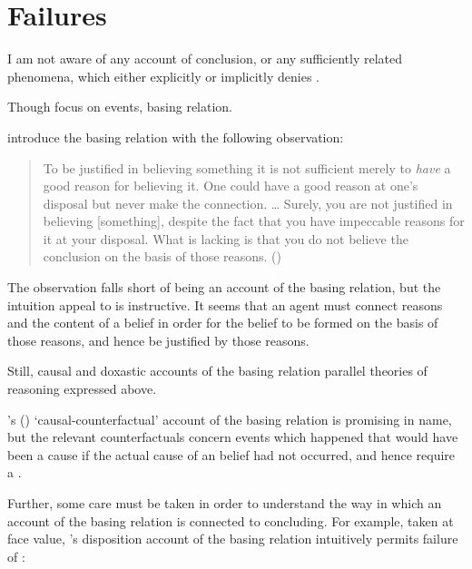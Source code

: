 \section{Failures}
\label{sec:failures}

\begin{note}
  I am not aware of any account of conclusion, or any sufficiently related phenomena, which either explicitly or implicitly denies \issueConstraint{}.
\end{note}

\begin{note}
  Though focus on events, basing relation.

  \citeauthor{Pollock:1999tm} introduce the basing relation with the following observation:
  \begin{quote}
    To be justified in believing something it is not sufficient merely to \emph{have} a good reason for believing it.
    One could have a good reason at one's disposal but never make the connection.
    \dots
    Surely, you are not justified in believing [something], despite the fact that you have impeccable reasons for it at your disposal.
    What is lacking is that you do not believe the conclusion on the basis of those reasons.\linebreak
    \mbox{}\hfill\mbox{(\citeyear[35]{Pollock:1999tm})}
  \end{quote}
  The observation falls short of being an account of the basing relation, but the intuition \citeauthor{Pollock:1999tm} appeal to is instructive.
  It seems that an agent must connect reasons and the content of a belief in order for the belief to be formed on the basis of those reasons, and hence be justified by those reasons.

  Still, causal and doxastic accounts of the basing relation parallel theories of reasoning expressed above.

  \citeauthor{Swain:1981wd}'s (\citeyear{Swain:1981wd}) `causal-counterfactual' account of the basing relation is promising in name, but the relevant counterfactuals concern events which happened that would have been a cause if the actual cause of an \agents{} belief had not occurred, and hence require a .

  Further, some care must be taken in order to understand the way in which an account of the basing relation is connected to concluding.
  For example, taken at face value, \citeauthor{Evans:2013tw}'s disposition account of the basing relation intuitively permits failure of \issueConstraint{}:


\end{note}
